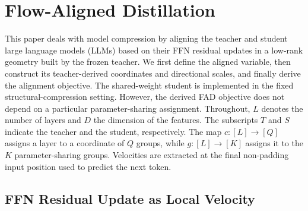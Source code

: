\documentclass{article}
\theoremstyle{plain}
\theoremstyle{definition}
\theoremstyle{remark}
\begin{document}
\section{Flow-Aligned Distillation}
\label{sec:method}

This paper deals with model compression by aligning the teacher and student large language models (LLMs) based on their FFN residual updates in a low-rank geometry built by the frozen teacher. We first define the aligned variable, then construct its teacher-derived coordinates and directional scales, and finally derive the alignment objective. The shared-weight student is implemented in the fixed structural-compression setting. However, the derived FAD objective does not depend on a particular parameter-sharing assignment. Throughout, $L$ denotes the number of layers and $D$ the dimension of the features. The subscripts $T$ and $S$ indicate the teacher and the student, respectively. The map $c:[L]\to[Q]$ assigns a layer to a coordinate of $Q$ groups, while $g:[L]\to[K]$ assigns it to the $K$ parameter-sharing groups. Velocities are extracted at the final non-padding input position used to predict the next token.

\subsection{FFN Residual Update as Local Velocity}
\label{sec:trajectory}
\end{document}
